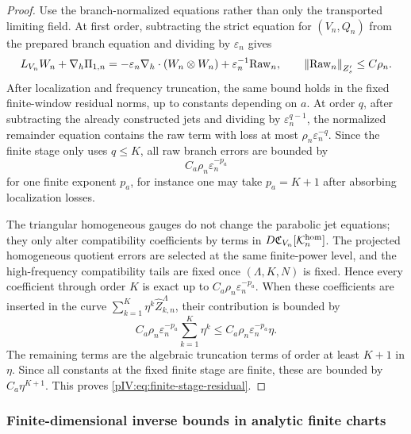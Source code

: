 \documentclass[11pt]{article}
\numberwithin{equation}{section}
\theoremstyle{plain}
\theoremstyle{definition}
\theoremstyle{remark}
\newcommand{\nabh}{\nabla_h}
\newcommand{\norm}[2]{\left\|#1\right\|_{#2}}
\newcommand{\calC}{\mathfrak C}
\newcommand{\calK}{\mathcal K}
\begin{document}
\begin{proof}
Use the branch-normalized equations rather than only the transported limiting field.
At first order, subtracting the strict equation for \((V_n,Q_n)\) from the prepared
branch equation and dividing by \(\varepsilon_n\) gives
\[
        L_{V_n}W_n+\nabh\Pi_{1,n}
        =-
        \varepsilon_n\nabh\cdot(W_n\otimes W_n)
        +\varepsilon_n^{-1}{\rm Raw}_n,
        \qquad
        \norm{{\rm Raw}_n}{Z_s'}\le C\rho_n .
\]
After localization and frequency truncation, the same bound holds in the fixed
finite-window residual norms, up to constants depending on \(a\). At order \(q\),
after subtracting the already constructed jets and dividing by \(\varepsilon_n^{q-1}\),
the normalized remainder equation contains the raw term with loss at most
\(\rho_n\varepsilon_n^{-q}\). Since the finite stage only uses \(q\le K\), all raw
branch errors are bounded by
\[
        C_a\rho_n\varepsilon_n^{-p_a}
\]
for one finite exponent \(p_a\), for instance one may take \(p_a=K+1\) after
absorbing localization losses.

The triangular homogeneous gauges do not change the parabolic jet equations; they
only alter compatibility coefficients by terms in \(D\calC_{V_n}[\calK^{\rm hom}_n]\).
The projected homogeneous quotient errors are selected at the same finite-power
level, and the high-frequency compatibility tails are fixed once \((\Lambda,K,N)\)
is fixed. Hence every coefficient through order \(K\) is exact up to
\(C_a\rho_n\varepsilon_n^{-p_a}\). When these coefficients are inserted in the curve
\(\sum_{k=1}^K\eta^k\widehat Z_{k,n}^\Lambda\), their contribution is bounded by
\[
        C_a\rho_n\varepsilon_n^{-p_a}
        \sum_{k=1}^K\eta^k
        \le C_a\rho_n\varepsilon_n^{-p_a}\eta .
\]
The remaining terms are the algebraic truncation terms of order at least \(K+1\) in
\(\eta\). Since all constants at the fixed finite stage are finite, these are bounded by
\(C_a\eta^{K+1}\). This proves \eqref{pIV:eq:finite-stage-residual}.
\end{proof}

\subsubsection{Finite-dimensional inverse bounds in analytic finite charts}
\end{document}

